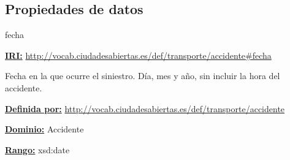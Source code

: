 \subsection{Propiedades de datos}



\begin{mybox}{fecha}
\begin{flushleft}
\underline{\textbf{IRI:}}
\url{http://vocab.ciudadesabiertas.es/def/transporte/accidente#fecha}
\newline

Fecha en la que ocurre el siniestro. Día, mes y año, sin incluir la hora del accidente.
\newline

\underline{\textbf{Definida por:}}\newline
\url{http://vocab.ciudadesabiertas.es/def/transporte/accidente}
\newline

\underline{\textbf{Dominio:}} Accidente
\newline

\underline{\textbf{Rango:}}  xsd:date
\newline

\end{flushleft}
\end{mybox}



